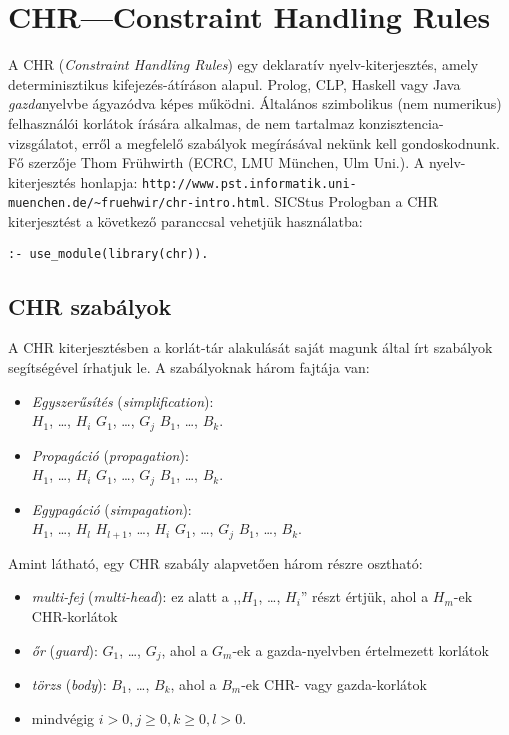 \clearpage

\chapter{CHR---Constraint Handling Rules\kieg}

A CHR (\emph{Constraint Handling Rules}) egy deklaratív nyelv-kiterjesztés,
amely determinisztikus kifejezés-átíráson alapul. Prolog, CLP, Haskell
vagy Java \emph{gazda}nyelvbe ágyazódva képes működni. Általános szimbolikus
(nem numerikus) felhasználói korlátok írására alkalmas, de nem tartalmaz
konzisztencia-vizsgálatot, erről a megfelelő szabályok megírásával
nekünk kell gondoskodnunk. Fő szerzője Thom Frühwirth (ECRC, LMU München, Ulm Uni.).
\br
A nyelv-kiterjesztés honlapja:
\verb'http://www.pst.informatik.uni-muenchen.de/~fruehwir/chr-intro.html'.
\br
SICStus Prologban a CHR kiterjesztést a következő paranccsal vehetjük használatba:
\begin{verbatim}
:- use_module(library(chr)).
\end{verbatim}

\section{CHR szabályok}

A CHR kiterjesztésben a korlát-tár alakulását saját magunk által írt szabályok
segítségével írhatjuk le. A szabályoknak három fajtája van:

\begin{itemize}
\item \emph{Egyszerűsítés} (\emph{simplification}):\\
 $H_1$, \ldots, $H_i$ \cd{<=>} $G_1$, \ldots, $G_j$ \cd{|} $B_1$,
 \ldots, $B_k$.
\item \emph{Propagáció} (\emph{propagation}):\\
 $H_1$, \ldots, $H_i$ \cd{==>} $G_1$, \ldots, $G_j$ \cd{|} $B_1$,
 \ldots, $B_k$. 
\item \emph{Egypagáció} (\emph{simpagation}):\\
 $H_1$, \ldots, $H_l$ \cd{\bs} $H_{l+1}$, \ldots, $H_i$ \cd{==>} $G_1$, \ldots, $G_j$ \cd{|} $B_1$,
 \ldots, $B_k$. 
\end{itemize}

Amint látható, egy CHR szabály alapvetően három részre osztható:

\begin{itemize}
\item \emph{multi-fej} (\emph{multi-head}): ez alatt a ,,$H_1$, \ldots, $H_i$'' részt
értjük, ahol a $H_m$-ek CHR-korlátok
\item \emph{őr} (\emph{guard}): $G_1$, \ldots, $G_j$, ahol a $G_m$-ek a gazda-nyelvben
értelmezett korlátok
\item \emph{törzs} (\emph{body}): $B_1$, \ldots, $B_k$, ahol a $B_m$-ek CHR- vagy
gazda-korlátok
\item mindvégig $i > 0, j \geq 0, k \geq 0, l > 0$.
\end{itemize}

